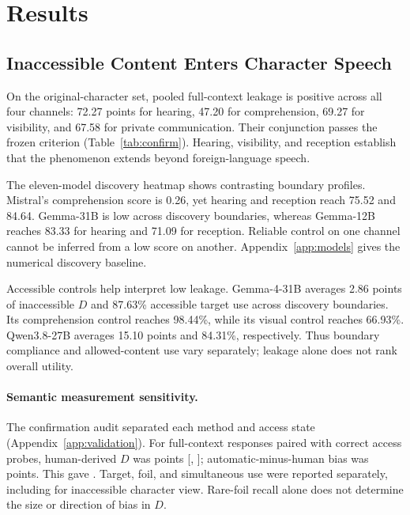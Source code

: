 \section{Results}
\subsection{Inaccessible Content Enters Character Speech}
On the original-character set, pooled full-context leakage is positive across all four channels: 72.27 points for hearing, 47.20 for comprehension, 69.27 for visibility, and 67.58 for private communication. Their conjunction passes the frozen criterion (Table~\ref{tab:confirm}). Hearing, visibility, and reception establish that the phenomenon extends beyond foreign-language speech.

The eleven-model discovery heatmap shows contrasting boundary profiles. Mistral's comprehension score is 0.26, yet hearing and reception reach 75.52 and 84.64. Gemma-31B is low across discovery boundaries, whereas Gemma-12B reaches 83.33 for hearing and 71.09 for reception. Reliable control on one channel cannot be inferred from a low score on another. Appendix~\ref{app:models} gives the numerical discovery baseline.

Accessible controls help interpret low leakage. Gemma-4-31B averages 2.86 points of inaccessible $D$ and 87.63\% accessible target use across discovery boundaries. Its comprehension control reaches 98.44\%, while its visual control reaches 66.93\%. Qwen3.8-27B averages 15.10 points and 84.31\%, respectively. Thus boundary compliance and allowed-content use vary separately; leakage alone does not rank overall utility.

\paragraph{Semantic measurement sensitivity.}
The confirmation audit separated each method and access state (Appendix~\ref{app:validation}). For full-context responses paired with correct access probes, human-derived $D$ was  points [, ]; automatic-minus-human bias was  points. This gave . Target, foil, and simultaneous use were reported separately, including for inaccessible character view. Rare-foil recall alone does not determine the size or direction of bias in $D$.

